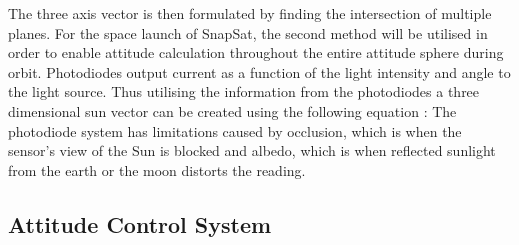 \vspace{-5mm}
The three axis vector is then formulated by finding the intersection of multiple planes. For the space launch of SnapSat, the second method will be utilised in order to enable attitude calculation throughout the entire attitude sphere during orbit. Photodiodes output current as a function of the light intensity and angle to the light source. Thus utilising the information from the photodiodes a three dimensional sun vector can be created using the following equation \cite{Springmann}:
The photodiode system has limitations caused by occlusion, which is when the sensor's view of the Sun is blocked and albedo, which is when reflected sunlight from the earth or the moon distorts the reading. \cite{Leake}
\subsection{Attitude Control System}
